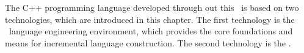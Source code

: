 
The C++ programming language developed through out this \MT\ is based on two technologies, which are 
introduced in this chapter. The first technology is the \jbmps\ language engineering environment, which 
provides the core foundations and means for incremental language construction. The second technology is
the \mbdp. 




